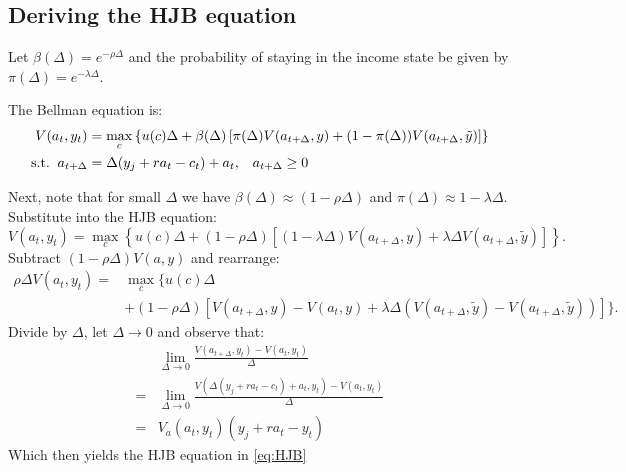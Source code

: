 \documentclass[12pt]{article}
\DeclareMathOperator{\1}{\mathbbm{1}}
\begin{document}
\begin{appendix}
\section{Deriving the HJB equation}\label{sec:HJBderivation}
Let $\beta(\Delta)=e^{-\rho \Delta}$ and the probability of staying in the income state be given by $\pi(\Delta)=e^{-\lambda \Delta}$.

The Bellman equation is:
\begin{align*}
V(a_t,y_t) &= \max_c \left\{u(c)\Delta +\beta(\Delta)\left[\pi(\Delta)V(a_{t+\Delta},y)+ (1-\pi(\Delta)) V(a_{t+\Delta},\tilde y)\right]  \right\} \\
\text{s.t.\;\;} a_{t+\Delta} &= \Delta(y_j + ra_t - c_t) + a_t,\;\;\; a_{t+\Delta}\ge 0
\end{align*}

Next, note that for small $\Delta$ we have $\beta(\Delta) \approx (1-\rho\Delta)$ and $\pi(\Delta)\approx 1-\lambda\Delta$. Substitute into the HJB equation:
$$ V(a_t,y_t) = \max_c \left\{u(c)\Delta +(1-\rho\Delta)\left[(1-\lambda\Delta)V(a_{t+\Delta},y)+ \lambda\Delta V(a_{t+\Delta},\tilde y)\right]  \right\}.$$
Subtract $(1-\rho\Delta) V(a,y)$ and rearrange:
\begin{align*} \rho \Delta V(a_t,y_t) =& \max_c \big\{u(c)\Delta   \\
& +(1-\rho\Delta)\left[V(a_{t+\Delta},y) - V(a_{t},y) + \lambda\Delta \left( V(a_{t+\Delta},\tilde y) - V(a_{t+\Delta},\tilde y) \right)\right] \big\}.
\end{align*}
Divide by $\Delta$, let $\Delta \to 0$ and observe that:
\begin{align*}
& \lim_{\Delta\to 0}  \frac{V(a_{t+\Delta},y_t) - V(a_t,y_t)}{\Delta} \\
=& \lim_{\Delta\to 0}  \frac{V(\Delta(y_j + ra_t - c_t) + a_t,y_t) - V(a_t,y_t)}{\Delta} \\
=& V_a(a_t,y_t)(y_j + ra_t - y_t)
\end{align*}
Which then yields the HJB equation in \eqref{eq:HJB}
\end{appendix}
\end{document}
